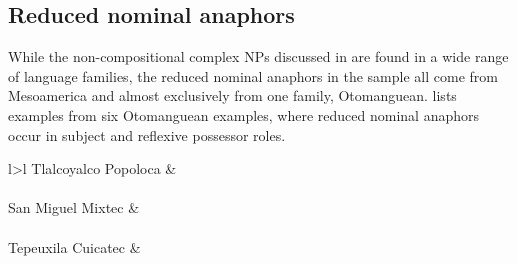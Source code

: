 \documentclass[output=collectionpaper]{langsci/langscibook}
\begin{document}
\subsection{Reduced nominal anaphors}
\label{sec:BW:5.3}

While the non-compositional complex NPs discussed in  are found in a wide range of language families, the reduced nominal anaphors in the sample all come from Mesoamerica and almost exclusively from one family, Otomanguean.  lists examples from six Otomanguean examples, where reduced nominal anaphors occur in subject and reflexive possessor roles.

\begin{table}
\begin{tabular}{l>{\setlength{\tabcolsep}{2pt}}l}
\lsptoprule
Tlalcoyalco Popoloca	& \\
\\
\padding
San Miguel Mixtec	    &	\\
\\
\padding
Tepeuxila Cuicatec	 &	
\end{tabular}
\end{table}
\end{document}
